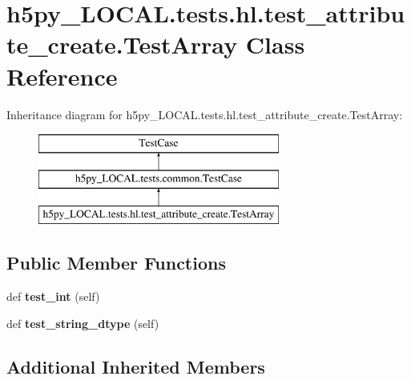 \hypertarget{classh5py__LOCAL_1_1tests_1_1hl_1_1test__attribute__create_1_1TestArray}{}\section{h5py\+\_\+\+L\+O\+C\+A\+L.\+tests.\+hl.\+test\+\_\+attribute\+\_\+create.\+Test\+Array Class Reference}
\label{classh5py__LOCAL_1_1tests_1_1hl_1_1test__attribute__create_1_1TestArray}
Inheritance diagram for h5py\+\_\+\+L\+O\+C\+A\+L.\+tests.\+hl.\+test\+\_\+attribute\+\_\+create.\+Test\+Array\+:\begin{figure}[H]
\begin{center}
\leavevmode
\includegraphics[height=3.000000cm]{classh5py__LOCAL_1_1tests_1_1hl_1_1test__attribute__create_1_1TestArray}
\end{center}
\end{figure}
\subsection*{Public Member Functions}
\begin{DoxyCompactItemize}
\item 
\mbox{\label{classh5py__LOCAL_1_1tests_1_1hl_1_1test__attribute__create_1_1TestArray_aa8ddef5ba50241fda8da05fa4abf1713}} 
def {\bfseries test\+\_\+int} (self)
\item 
\mbox{\label{classh5py__LOCAL_1_1tests_1_1hl_1_1test__attribute__create_1_1TestArray_a27f025b150d842ef7c999f71ca0a6768}} 
def {\bfseries test\+\_\+string\+\_\+dtype} (self)
\end{DoxyCompactItemize}
\subsection*{Additional Inherited Members}


